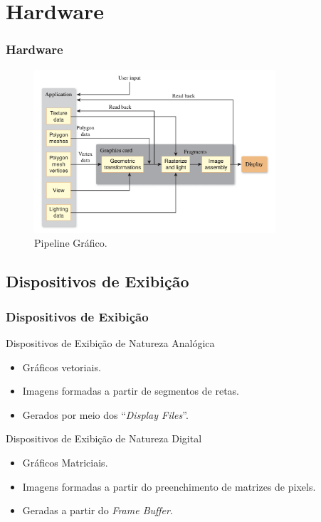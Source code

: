 \documentclass{beamer}
\begin{document}

\section{Hardware}
\begin{frame}
\frametitle{Hardware}

	\begin{figure}[!h]
		\begin{center}
			\includegraphics[width=0.8\textwidth]{Figures/graphicPipeline}
			\caption{Pipeline Gráfico.}
		\end{center}
		
	\end{figure}

\end{frame}



\subsection{Dispositivos de Exibição}
\begin{frame}
\frametitle{Dispositivos de Exibição}
	
	\begin{block}{Dispositivos de Exibição de Natureza Analógica}
		\begin{itemize}
			\item Gráficos vetoriais.
			\item Imagens formadas a partir de segmentos de retas.
			\item Gerados por meio dos ``\textit{Display Files}''.
		\end{itemize}
	\end{block}
	
	\begin{block}{Dispositivos de Exibição de Natureza Digital}
		\begin{itemize}
			\item Gráficos Matriciais.
			\item Imagens formadas a partir do preenchimento de matrizes de pixels.
			\item Geradas a partir do \textit{Frame Buffer}.
		\end{itemize}
	\end{block}

\end{frame}
\end{document}
